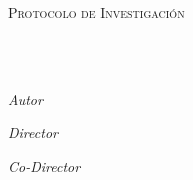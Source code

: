 \documentclass[
12pt, %
singlespacing, %
headsepline, %
]{MastersDoctoralThesis} %
\author{José Carlos \textsc{Gallegos-Mariscal}} %
\begin{document}
\frontmatter %

\pagestyle{plain} %


\begin{titlepage}
\begin{center}

{\scshape\LARGE \univname\par}\vspace{1cm} %
\textsc{Protocolo de Investigación}\\[0.5cm] %

\HRule \\%
{\huge \bfseries \ttitle\par}\vspace{0.4cm} %
\HRule \\[0.5cm] %

\begin{minipage}[t]{0.6\textwidth}
\large \center
\emph{Autor}\\
\href{https://www.linkedin.com/in/jscarlos/}{\authorname} %
\vspace{0.5cm}
\end{minipage}
\begin{minipage}[t]{0.6\textwidth}
\large \center
\emph{Director} \\
\href{https://scholar.google.com.mx/citations?user=egt6SVMAAAAJ&hl=en}{\dirname} %
\vspace{0.2cm}
\end{minipage}
\begin{minipage}[t]{0.6\textwidth}
\large \center
\emph{Co-Director} \\
\href{https://google.com}{\codirname} %
\vspace{0.2cm}
\end{minipage}\\[1.5cm]


\end{center}
\end{titlepage}
\end{document}
